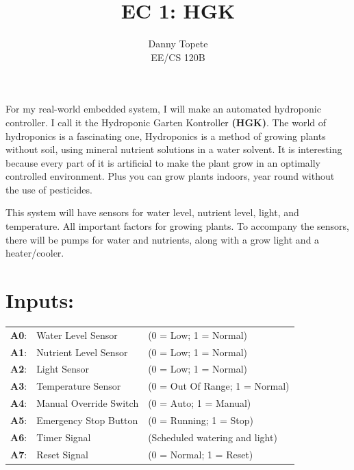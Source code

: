 \documentclass[12pt]{article}
\begin{document}
 
 
\title{EC 1: HGK}
\author{Danny Topete\\ %
EE/CS 120B}

\maketitle

\doublespacing

For my real-world embedded system, I will make an automated hydroponic controller.
I call it the Hydroponic Garten Kontroller \textbf{(HGK)}. 
The world of hydroponics is a fascinating one,
Hydroponics is a method of growing plants without soil,
using mineral nutrient solutions in a water solvent.
It is interesting because every part of it is artificial to make
the plant grow in an optimally controlled environment. 
Plus you can grow plants indoors, year round without the use of pesticides.

This system will have sensors for water level, nutrient level, light, and temperature.
All important factors for growing plants. To accompany the sensors, there will be pumps for water and nutrients,
along with a grow light and a heater/cooler. 
\pagebreak
\section{Inputs:}

\begin{tabular}{ l l l }
   \textbf{A0}: & Water Level Sensor & \quad (0 = Low; 1 = Normal) \\
   \textbf{A1}: & Nutrient Level Sensor & \quad (0 = Low; 1 = Normal) \\
   \textbf{A2}: & Light Sensor & \quad (0 = Low; 1 = Normal) \\
   \textbf{A3}: & Temperature Sensor & \quad (0 = Out Of Range; 1 = Normal) \\
   \textbf{A4}: & Manual Override Switch & \quad (0 = Auto; 1 = Manual) \\
   \textbf{A5}: & Emergency Stop Button & \quad (0 = Running; 1 = Stop) \\
   \textbf{A6}: & Timer Signal & \quad (Scheduled watering and light) \\
   \textbf{A7}: & Reset Signal & \quad (0 = Normal; 1 = Reset) \\
\end{tabular}
\end{document}
